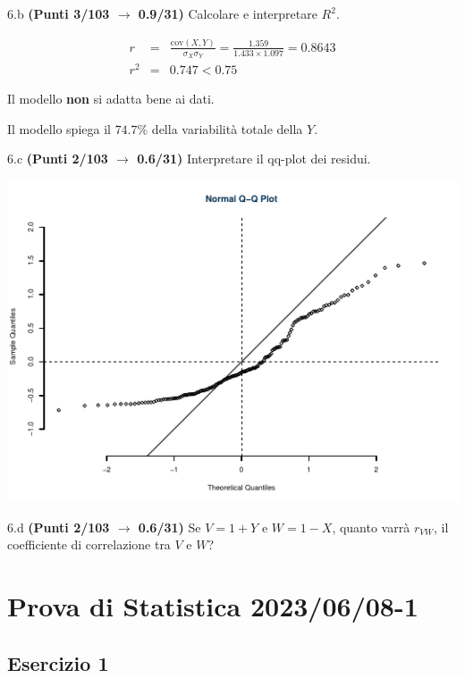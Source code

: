 \documentclass[
  11pt,
]{book}
\theoremstyle{mytheoremstyle}
\theoremstyle{mydefstyle}
\newenvironment{sol}
  {
  \begin{tcolorbox}[enhanced,breakable,arc=0.1mm,boxrule=1pt,colback=white,colframe=iblue,
  title=\bf \fontfamily{lmss}\selectfont \hspace{.5 cm} Soluzione,drop fuzzy shadow]

}{
\end{tcolorbox}
  }
\begin{document}
6.b \textbf{(Punti 3/103 \(\rightarrow\) 0.9/31)} Calcolare e interpretare \(R^2\).

\begin{sol}
\begin{eqnarray*}
r&=&\frac{\text{cov}(X,Y)}{\sigma_X\sigma_Y}=\frac{ 1.359 }{ 1.433 \times 1.097 }= 0.8643 \\ 
r^2&=& 0.747 < 0.75
\end{eqnarray*}

Il modello \textbf{non} si adatta bene ai dati.

Il modello spiega il \(74.7\%\) della variabilità totale della \(Y\).

\end{sol}

6.c \textbf{(Punti 2/103 \(\rightarrow\) 0.6/31)} Interpretare il qq-plot dei residui.

\begin{center}\includegraphics{Esami_passati_con_soluzioni_files/figure-latex/2023-32,-1} \end{center}

6.d \textbf{(Punti 2/103 \(\rightarrow\) 0.6/31)} Se \(V=1+ Y\) e \(W=1-X\), quanto varrà \(r_{VW}\), il coefficiente di correlazione tra \(V\) e \(W\)?

\section{Prova di Statistica 2023/06/08-1}\label{prova-di-statistica-20230608-1}

\subsection{Esercizio 1}\label{esercizio-1-25}
\end{document}
